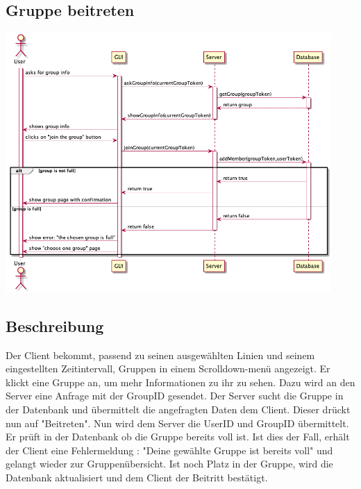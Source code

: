 \documentclass[a4paper]{scrreprt}
\begin{document}
\subsection{Gruppe beitreten}
\begin{center}
	\includegraphics[width=0.93\textwidth]{Sequenzdiagramme/checkInfoAndJoinGroupSD.png}
\end{center}

\subsection*{Beschreibung}
Der Client bekommt, passend zu seinen ausgewählten Linien und seinem eingestellten Zeitintervall, Gruppen in einem Scrolldown-menü angezeigt.
Er klickt eine Gruppe an, um mehr Informationen zu ihr zu sehen. Dazu wird an den Server eine Anfrage mit der GroupID gesendet. Der Server sucht die Gruppe in der Datenbank und übermittelt die angefragten Daten dem Client. Dieser drückt nun auf "Beitreten". Nun wird dem Server die UserID und GroupID übermittelt. Er prüft in der Datenbank ob die Gruppe bereits voll ist. Ist dies der Fall, erhält der Client eine Fehlermeldung : "Deine gewählte Gruppe ist bereits voll" und gelangt wieder zur Gruppenübersicht. Ist noch Platz in der Gruppe, wird die Datenbank aktualisiert und dem Client der Beitritt bestätigt. 

\newpage
\end{document}
